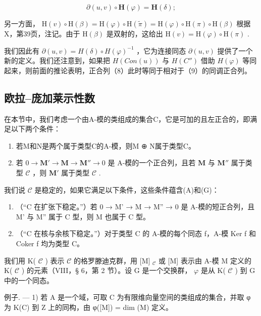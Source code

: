 \[
\partial (u, v) \circ \mathbf {H} (\varphi) = \mathbf {H} (\delta);
\]

另一方面， \(\mathrm{H}(v) \circ \mathrm{H}(\beta) = \mathrm{H}(\varphi) \circ \mathrm{H}(\tilde{\pi}) = \mathrm{H}(\varphi) \circ \mathrm{H}(\pi) \circ \mathrm{H}(\beta)\) 根据X，第39页，注记。由于 \(\mathrm{H}(\beta)\) 是双射的，这给出 \(\mathrm{H}(v) = \mathrm{H}(\varphi) \circ \mathrm{H}(\pi)\) .

我们因此有 \(\partial(u, v) = H(\delta) \circ H(\varphi)^{-1}\) ，它为连接同态 \(\partial(u, v)\) 提供了一个新的定义。我们还注意到，如果把 \(H(Con(u))\) 与 \(H(C'')\) 借助 \(H(\varphi)\) 等同起来，则前面的推论表明，正合列（8）此时等同于相对于（9）的同调正合列。

\subsection{欧拉–庞加莱示性数}

在本节中，我们考虑一个由A-模的类组成的集合C，它是可加的且左正合的，即满足以下两个条件：

\begin{enumerate}
\def\labelenumi{(\Alph{enumi})}
\item
  若M和N是两个属于类型C的A-模，则M ⊕ N属于类型C。
\item
  若 \(0 \to \mathbf{M}' \to \mathbf{M} \to \mathbf{M}'' \to 0\) 是 A-模的一个正合列，且若 \(\mathbf{M}\) 与 \(\mathbf{M}''\) 属于类型 \(\mathcal{C}\) ，则 \(\mathbf{M}'\) 属于类型 \(\mathcal{C}\) .
\end{enumerate}

我们说 \(\mathcal{C}\) 是稳定的，如果它满足以下条件，这些条件蕴含(A)和(G)：

\begin{enumerate}
\def\labelenumi{(\Alph{enumi})}
\setcounter{enumi}{4}
\item
  （“C 在扩张下稳定。”）若 0 → M' → M → M'' → 0 是 A-模的短正合列，且 M' 与 M'' 属于 C 型，则 M 也属于 C 型。
\item
  （“C 在核与余核下稳定。”）对于类型 C 的 A-模的每个同态 f，A-模 Ker f 和 Coker f 均为类型 C。
\end{enumerate}

我们用 K( \(\mathcal{C}\) ) 表示 \(\mathcal{C}\) 的格罗滕迪克群，用 {[}M{]} \(_{\mathcal{C}}\) 或 {[}M{]} 表示由 A-模 M 定义的 K( \(\mathcal{C}\) ) 的元素（VIII，§ 6，第 2 节）。设 G 是一个交换群， \(\varphi\) 是从 K( \(\mathcal{C}\) ) 到 G 中的一个同态。

例子. --- 1) 若 A 是一个域，可取 C 为有限维向量空间的类组成的集合，并取 φ 为 K(C) 到 Z 上的同构，由 φ({[}M{]}) = dim (M) 定义。

